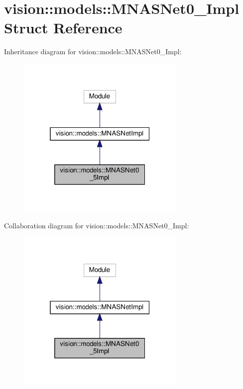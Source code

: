 \hypertarget{structvision_1_1models_1_1MNASNet0__5Impl}{}\section{vision\+:\+:models\+:\+:M\+N\+A\+S\+Net0\+\_\+Impl Struct Reference}
\label{structvision_1_1models_1_1MNASNet0__5Impl}


Inheritance diagram for vision\+:\+:models\+:\+:M\+N\+A\+S\+Net0\+\_\+Impl\+:
\nopagebreak
\begin{figure}[H]
\begin{center}
\leavevmode
\includegraphics[width=229pt]{structvision_1_1models_1_1MNASNet0__5Impl__inherit__graph}
\end{center}
\end{figure}


Collaboration diagram for vision\+:\+:models\+:\+:M\+N\+A\+S\+Net0\+\_\+Impl\+:
\nopagebreak
\begin{figure}[H]
\begin{center}
\leavevmode
\includegraphics[width=229pt]{structvision_1_1models_1_1MNASNet0__5Impl__coll__graph}
\end{center}
\end{figure}
